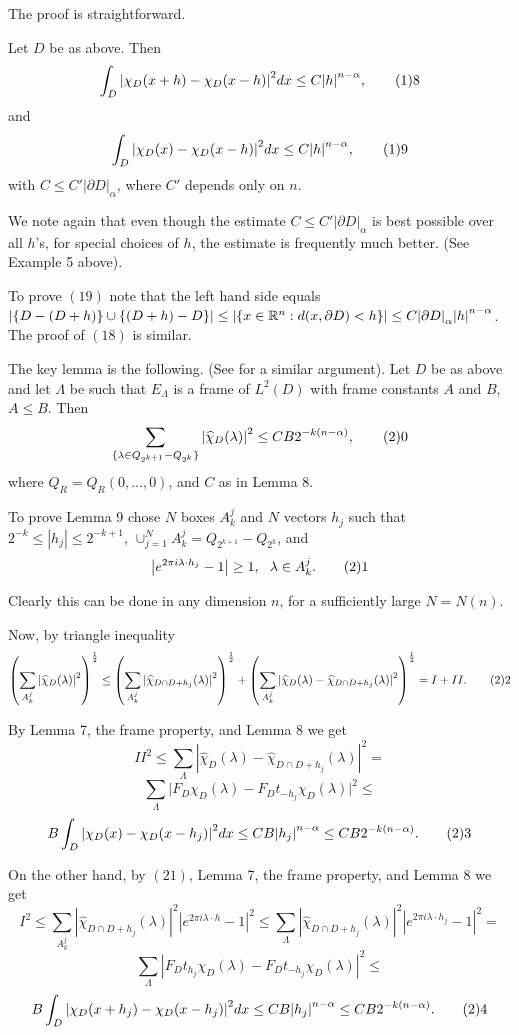 The proof is straightforward. 

 Let $D$ be as above. Then 
$$ \int_{D} {|\chi_D(x+h)-\chi_D(x-h)|}^2 dx \leq C{|h|}^{n-\alpha}, 
\tag18$$ and
$$ \int_{D} {|\chi_D(x)-\chi_D(x-h)|}^2 dx \leq C{|h|}^{n-\alpha}, \tag19$$ 
with $C \leq C'{|\partial D|}_{\alpha}$, where $C'$ depends only on $n$.  
\endproclaim 

 We note again that even though the estimate 
$C \leq C'{|\partial D|}_{\alpha}$ is best possible over all $h$'s, for 
special choices of $h$, the estimate is frequently much better. (See 
Example 5 above). \endremark 

To prove $(19)$ note that the left hand side equals 
$|\{D-(D+h)\} \cup \{(D+h)-D\}| \leq |\{x \in {\Bbb R}^n: 
d(x, \partial D)<h\}| \leq C {|\partial D|}_{\alpha} {|h|}^{n-\alpha}$. 
The proof of $(18)$ is similar. 

The key lemma is the following. (See \cite{BCT} for a similar argument). 
 Let $D$ be as above and let $\Lambda$ be such that 
$E_{\Lambda}$ is a frame of $L^2(D)$ with frame constants $A$ and $B$, 
$A \leq B$. Then 
$$ \sum_{\{ \lambda \in Q_{2^{k+1}}-Q_{2^k}\}} {|\widehat{\chi}_D(\lambda)|}^2 
\leq CB2^{-k(n-\alpha)}, \tag20$$ where $Q_R=Q_R(0, ..., 0)$, and $C$ as in 
Lemma 8. 
\endproclaim 

To prove Lemma 9 chose $N$ boxes $A_k^j$ and $N$ vectors $h_j$ such that 
$2^{-k} \leq |h_j| \leq 2^{-k+1}$, $\cup_{j=1}^N A_k^j=Q_{2^{k+1}}-Q_{2^k}$,
and 
$$ \left|e^{2 \pi i \lambda \cdot h_j}-1 \right| \ge 1, \ \ 
\lambda \in A_k^j. \tag21$$ 

Clearly this can be done in any dimension $n$, for a sufficiently large 
$N=N(n)$. 

Now, by triangle inequality 
$$ {\left( \sum_{A_k^j} {|\widehat{\chi}_D(\lambda)|}^2 \right)}^{\frac{1}{2}} 
\leq {\left( 
\sum_{A_k^j} {|\widehat{\chi}_{D \cap D+h_j}(\lambda)|}^2 \right)}^
{\frac{1}{2}}+ {\left(
\sum_{A_k^j} {|\widehat{\chi}_D(\lambda)-\widehat{\chi}_{D \cap D+h_j} 
(\lambda)|}^2 \right)}^{\frac{1}{2}}=I+II. \tag22$$ 

By Lemma 7, the frame property, and Lemma 8 we get 
$$ {II}^2 \leq \sum_{\Lambda} {|\widehat{\chi}_D(\lambda)-\widehat{\chi}_
{D \cap D+h_j}(\lambda)|}^2=$$ 
$$ \sum_{\Lambda} {|F_D\chi_D(\lambda)-F_Dt_{-h_j}\chi_D(\lambda)}|^2 \leq$$ 
$$ B \int_D {|\chi_D(x)-\chi_D(x-h_j)|}^2 dx \leq 
CB{|h_j|}^{n-\alpha} \leq CB2^{-k(n-\alpha)}. \tag23$$

On the other hand, by $(21)$, Lemma 7, the frame property, and Lemma 8 we get
$$ I^2 \leq \sum_{A_k^j} {|\widehat{\chi}_{D \cap D+h_j}(\lambda)|}^2 
{|e^{2 \pi i \lambda \cdot h}-1|}^2 \leq 
\sum_{\Lambda} {|\widehat{\chi}_{D \cap D+h_j}(\lambda)|}^2 
{|e^{2 \pi i \lambda \cdot h_j}-1|}^2=$$ 
$$ \sum_{\Lambda} {|F_Dt_{h_j}\chi_D(\lambda)-F_Dt_{-h_j}\chi_D(\lambda)|}^2
\leq$$ 
$$ B \int_D {|\chi_D(x+h_j)-\chi_D(x-h_j)|}^2 dx \leq 
CB{|h_j|}^{n-\alpha} \leq CB2^{-k(n-\alpha)}. 
\tag24$$ 

